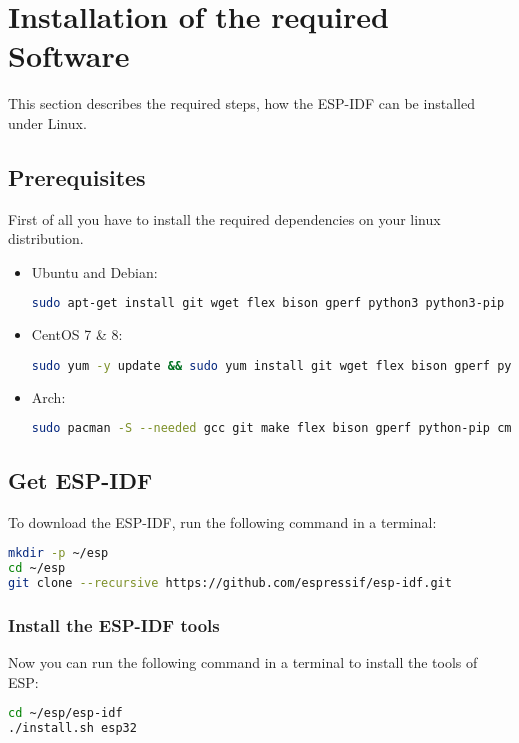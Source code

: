 \section{Installation of the required Software}
This section describes the required steps, how the ESP-IDF can be installed under Linux.


\subsection{Prerequisites}

First of all you have to install the required dependencies on your linux distribution.

\begin{itemize}

\item Ubuntu and Debian:
\begin{lstlisting}[language=bash]
sudo apt-get install git wget flex bison gperf python3 python3-pip python3-setuptools cmake ninja-build ccache libffi-dev libssl-dev dfu-util libusb-1.0-0
\end{lstlisting}

\item CentOS 7 \& 8:
\begin{lstlisting}[language=bash]
sudo yum -y update && sudo yum install git wget flex bison gperf python3 python3-pip python3-setuptools cmake ninja-build ccache dfu-util libusbx
\end{lstlisting}

\item Arch:
\begin{lstlisting}[language=bash]
sudo pacman -S --needed gcc git make flex bison gperf python-pip cmake ninja ccache dfu-util libusb
\end{lstlisting}

\end{itemize}

\subsection{Get ESP-IDF}
To download the ESP-IDF, run the following command in a terminal:
\begin{lstlisting}[language=bash]
mkdir -p ~/esp
cd ~/esp
git clone --recursive https://github.com/espressif/esp-idf.git
\end{lstlisting}

\subsubsection{Install the ESP-IDF tools}
Now you can run the following command in a terminal to install the tools of ESP:
\begin{lstlisting}[language=bash]
cd ~/esp/esp-idf
./install.sh esp32
\end{lstlisting}

